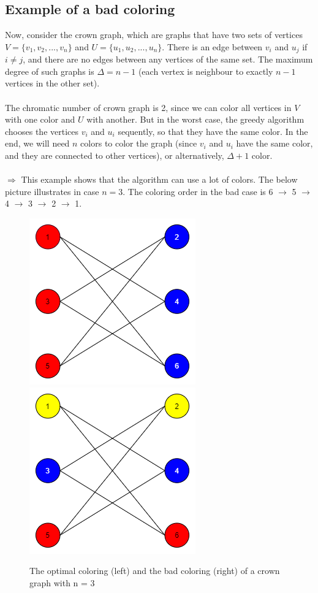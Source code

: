 \documentclass{article}
\begin{document}
\subsection*{Example of a bad coloring}
Now, consider the crown graph, which are graphs that have two sets of vertices $V = \{v_{1}, v_{2}, ..., v_{n}\}$ and $U = \{u_{1}, u_{2}, ..., u_{n}\}$. There is an edge between $v_{i}$ and ${u_{j}}$ if $i \neq j$, and there are no edges between any vertices of the same set. The maximum degree of such graphs is $\Delta = n - 1$ (each vertex is neighbour to exactly $n-1$ vertices in the other set).  \\\\
The chromatic number of crown graph is 2, since we can color all vertices in $V$ with one color and $U$ with another. But in the worst case, the greedy algorithm chooses the vertices $v_{i}$ and $u_{i}$ sequently, so that they have the same color. In the end, we will need $n$ colors to color the graph (since $v_{i}$ and $u_{i}$ have the same color, and they are connected to other vertices), or alternatively, $\Delta + 1$ color. \\\\
$\Rightarrow$ This example shows that the algorithm can use a lot of colors. The below picture illustrates in case $n = 3$.  The coloring order in the bad case is  6 $\rightarrow$ 5 $\rightarrow$ 4 $\rightarrow$ 3 $\rightarrow$ 2 $\rightarrow$ 1.
\begin{figure}[h]
    \centering
    \includegraphics[scale = 0.38]{1a_1}
    \includegraphics[scale = 0.38]{1a_2}
    \caption{The optimal coloring (left) and the bad coloring (right) of a crown graph with n = 3}
\end{figure}
\end{document}
